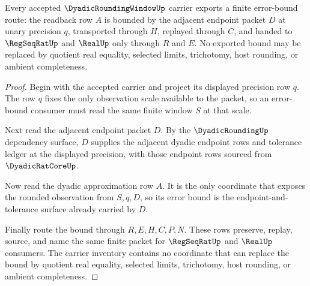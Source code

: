 \begin{theorem}
\label{thm:dyadicroundingwindow-error-bound}
Every accepted $\DyadicRoundingWindowUp$ carrier exports a finite error-bound route: the readback row $A$ is bounded by the adjacent endpoint packet $D$ at unary precision $q$, transported through $H$, replayed through $C$, and handed to $\RegSeqRatUp$ and $\RealUp$ only through $R$ and $E$. No exported bound may be replaced by quotient real equality, selected limits, trichotomy, host rounding, or ambient completeness.
\end{theorem}
\begin{proof}
Begin with the accepted carrier and project its displayed precision row $q$. The row $q$ fixes the only observation scale available to the packet, so an error-bound consumer must read the same finite window $S$ at that scale.

Next read the adjacent endpoint packet $D$. By the $\DyadicRoundingUp$ dependency surface, $D$ supplies the adjacent dyadic endpoint rows and tolerance ledger at the displayed precision, with those endpoint rows sourced from $\DyadicRatCoreUp$.

Now read the dyadic approximation row $A$. It is the only coordinate that exposes the rounded observation from $S,q,D$, so its error bound is the endpoint-and-tolerance surface already carried by $D$.

Finally route the bound through $R,E,H,C,P,N$. These rows preserve, replay, source, and name the same finite packet for $\RegSeqRatUp$ and $\RealUp$ consumers. The carrier inventory contains no coordinate that can replace the bound by quotient real equality, selected limits, trichotomy, host rounding, or ambient completeness.
\end{proof}

